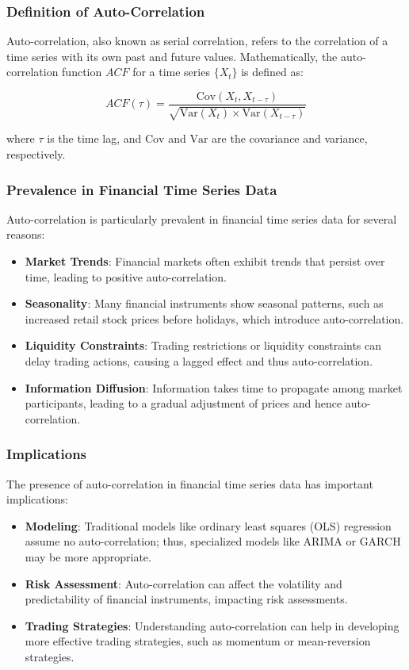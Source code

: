 \documentclass[12pt, twoside,hidelinks]{article}
\theoremstyle{definition}
\numberwithin{equation}{section}
\begin{document}
\subsubsection*{Definition of Auto-Correlation}

Auto-correlation, also known as serial correlation, refers to the correlation of a time series with its own past and future values. Mathematically, the auto-correlation function \(ACF\) for a time series \( \{X_t\} \) is defined as:

\[
ACF(\tau) = \frac{\text{Cov}(X_t, X_{t-\tau})}{\sqrt{\text{Var}(X_t) \times \text{Var}(X_{t-\tau})}}
\]

where \( \tau \) is the time lag, and \( \text{Cov} \) and \( \text{Var} \) are the covariance and variance, respectively.

\subsubsection*{Prevalence in Financial Time Series Data}

Auto-correlation is particularly prevalent in financial time series data for several reasons:

\begin{itemize}
    \item \textbf{Market Trends}: Financial markets often exhibit trends that persist over time, leading to positive auto-correlation.
    \item \textbf{Seasonality}: Many financial instruments show seasonal patterns, such as increased retail stock prices before holidays, which introduce auto-correlation.
    \item \textbf{Liquidity Constraints}: Trading restrictions or liquidity constraints can delay trading actions, causing a lagged effect and thus auto-correlation.
    \item \textbf{Information Diffusion}: Information takes time to propagate among market participants, leading to a gradual adjustment of prices and hence auto-correlation.
\end{itemize}

\subsubsection*{Implications}

The presence of auto-correlation in financial time series data has important implications:

\begin{itemize}
    \item \textbf{Modeling}: Traditional models like ordinary least squares (OLS) regression assume no auto-correlation; thus, specialized models like ARIMA or GARCH may be more appropriate.
    \item \textbf{Risk Assessment}: Auto-correlation can affect the volatility and predictability of financial instruments, impacting risk assessments.
    \item \textbf{Trading Strategies}: Understanding auto-correlation can help in developing more effective trading strategies, such as momentum or mean-reversion strategies.
\end{itemize}
\end{document}
